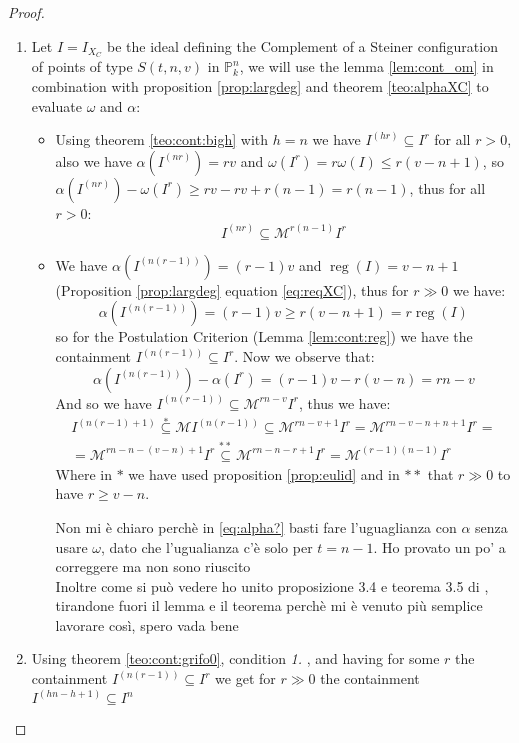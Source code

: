 \documentclass[a4wide]{book}
\theoremstyle{plain}
\theoremstyle{remark}
\theoremstyle{definition}
\newcommand{\PP}{\mathbb{P}}
\newcommand{\MM}{\mathcal{M}}
\newcommand{\cont}[2]{ I^{(#1)} \subseteq I^{#2}}
\newcommand{\mcont}[3]{ I^{(#1)} \subseteq \MM^{#2} I^{#3}}
\DeclareMathOperator{\reg}{reg}
\newcounter{que}
\begin{document}
\begin{proof}
\begin{enumerate}
\item Let $ I = I_{X_C}$ be the ideal defining the Complement of a Steiner configuration of points of type $ S(t,n,v) $ in $ \PP_k^n $, we will use the lemma \ref{lem:cont_om} in combination with proposition \ref{prop:largdeg} and theorem \ref{teo:alphaXC} to evaluate $\omega$ and $\alpha$:
	\begin{itemize}
	\item Using theorem \ref{teo:cont:bigh} with $ h=n $ we have $ \cont{hr}{r} $ for all $ r>0 $, also we have $ \alpha(I^{(nr)}) = rv $ and $ \omega(I^r)=r\omega(I)  \leq r(v-n+1) $, so $  \alpha(I^{(nr)}) - \omega(I^r) \geq rv - rv + r(n-1) = r(n-1) $, thus for all $ r>0 $:
	\[ 
	\mcont{nr}{r(n-1)}{r}
	\]
	\item We have $\alpha(I^{(n(r-1))}) = (r-1)v $ and $ \reg(I) = v-n+1 $ (Proposition \ref{prop:largdeg} equation \ref{eq:reqXC}), thus for $ r \gg 0 $ we have:
	\[ \alpha(I^{(n(r-1))}) = (r-1)v \geq r(v-n+1) = r \reg(I)\]
	so for the Postulation Criterion (Lemma \ref{lem:cont:reg}) we have the containment $ \cont{n(r-1)}{r} $. Now we observe that:
\begin{equation} \label{eq:alpha?}
	\alpha(I^{(n(r-1))}) - \alpha (I^r) = (r-1)v - r(v-n)=rn -v
\end{equation}
 And so we have $ \mcont{n(r-1)}{rn-v}{r} $, thus we have:
 \begin{multline*}
 I^{(n(r-1)+1)} \stackrel{*}{\subseteq} \mathcal{M} I^{(n(r-1))} \subseteq \mathcal{M}^{r n-v+1} I^{r} =\mathcal{M}^{r n-v-n+n+1} I^{r}=\\
 =\mathcal{M}^{r n-n-(v-n)+1} I^{r} 
  \stackrel{**}{\subseteq} \mathcal{M}^{r n-n-r+1} I^{r}=\mathcal{M}^{(r-1)(n-1)} I^{r}
 \end{multline*}
 Where in $ \ast $ we have used proposition \ref{prop:eulid} and in $ \ast \ast $ that $ r \gg 0 $ to have $ r \geq v-n $.
	
	\begin{tboxque}
	Non mi è chiaro perchè in \ref{eq:alpha?} basti fare l'uguaglianza con $ \alpha $ senza usare $\omega$, dato che l'ugualianza c'è solo per $ t = n-1 $. Ho provato un po' a correggere ma non sono riuscito\\
	Inoltre come si può vedere ho unito proposizione 3.4 e teorema 3.5 di \cite{Bal21Steiner}, tirandone fuori il lemma e il teorema perchè mi è venuto più semplice lavorare così, spero vada bene
	\end{tboxque}
	
	\end{itemize}
\item Using theorem \ref{teo:cont:grifo0}, condition \textit{1.} , and having for some $ r $ the containment $ \cont{n(r-1)}{r} $ we get for $ r \gg 0 $ the containment $ \cont{hn - h +1}{n} $
\end{enumerate}
\end{proof}
\end{document}

